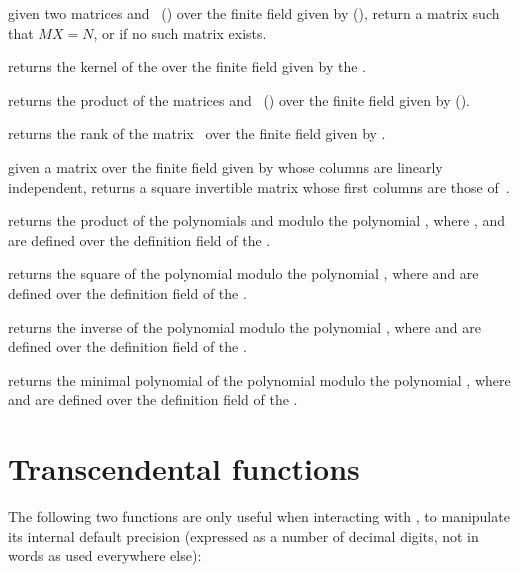  given two matrices
 and~ () over the finite field given by
 (), return a matrix  such that $MX=N$, or
 if no such matrix exists.

 returns the kernel of the 
 over the finite field given by the  .

 returns the product of the
matrices  and~ () over the finite field given
by  ().

 returns the rank of the
matrix~ over the finite field given by .

 given a matrix  over the
finite field given by  whose columns are linearly independent,
returns a square invertible matrix whose first columns are those
of~.


 returns the product
of the polynomials  and  modulo the polynomial , where
,  and  are defined over the definition field of the
 .

 returns the square
of the polynomial  modulo the polynomial , where  and
 are defined over the definition field of the  .

 returns the inverse
of the polynomial  modulo the polynomial , where  and
 are defined over the definition field of the  .

 returns the minimal
polynomial of the polynomial  modulo the polynomial , where
 and  are defined over the definition field of the 
.

\section{Transcendental functions}

The following two functions are only useful when interacting with ,
to manipulate its internal default precision (expressed as a number of
decimal digits, not in words as used everywhere else):

